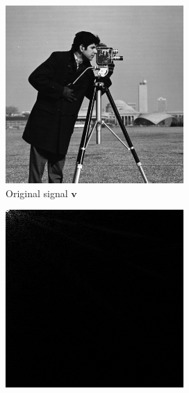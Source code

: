 \begin{figure}
  \centering
  \begin{subfigure}{0.45\textwidth}
    \centering
    \includegraphics[width=\textwidth]{Chapter3/Images/cameraman.png}
    \caption{Original signal $\bm v$}
  \end{subfigure}
  \begin{subfigure}{0.45\textwidth}
    \centering
    \includegraphics[width=\textwidth]{Chapter3/Images/dctCoeff.png}

\end{subfigure}
\end{figure}
